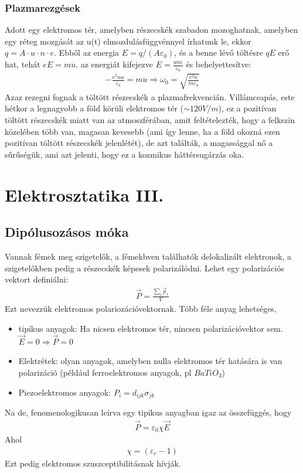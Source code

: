 \documentclass{article}
\begin{document}
\subsubsection{Plazmarezgések}
Adott egy elektromos tér, amelyben részecskék szabadon mozoghatnak, amelyben egy réteg mozgását az u(t) elmozdulásfüggvénnyel írhatunk le, ekkor $q=A\cdot u \cdot n \cdot e$. Ebből az energia $E=q/(A\varepsilon_0)$, és a benne lévő töltésre $qE$ erő hat, tehát $eE=m\ddot{u}$. az energiát kifejezve $E=\frac{une}{\varepsilon_0}$ és behelyettesítve:
\begin{gather*}
-\frac{e^2 n u}{\varepsilon_0} = m\ddot{u} \Rightarrow \omega_0 = \sqrt{\frac{e^2 n}{m\varepsilon_0}}
\end{gather*}
Azaz rezegni fognak a töltött részecskék a plazmafrekvencián.
Villámcsapás, este hétkor a legnagyobb a föld körüli elektromos tér ($\sim 120 V/m$), ez a pozitívan töltött részecskék miatt van az atmoszférában, amit feltételezték, hogy a felkszín közelében több van, magasan kevesebb (ami így lenne, ha a föld okozná ezen pozitívan töltött részecskék jelenlétét), de azt találták, a magassággal nő a sűrűségük, ami azt jelenti, hogy ez a kozmikus háttérsugárzás oka. 

\newpage
\section{Elektrosztatika III.}
\subsection{Dipólusozásos móka}
Vannak fémek meg szigetelők, a fémekbven találhatók delokalizált elektronok, a szigetelőkben pedig a részecskék képesek polarizálódni. Lehet egy polarizációs vektort definiálni:
\begin{gather*}
\vec{P} = \frac{\sum_i \vec{p}_i}{V}
\end{gather*}
Ezt nevezzük elektromos polariozációvektornak. Több féle anyag lehetséges, 
\begin{itemize}
\item tipikus anyagok: Ha nicsen elektromos tér, nincsen polarizációvektor sem. $\vec{E}=0 \Rightarrow \vec{P}=0$ 
\item Elektrétek: olyan anyagok, amelyben nulla elektromos tér hatására is van polarizáció (például ferroelektromos anyagok, pl $BaTiO_3$)
\item Piezoelektromos anyagok: $P_i = d_{ijk} \sigma_{jk}$
\end{itemize}
Na de, fenomenologikusan leírva egy tipikus anyagban igaz az összefüggés, hogy
\begin{gather*}
\vec{P} = \varepsilon_0 \chi \vec{E}
\end{gather*}
Ahol \begin{gather*}
\chi = (\varepsilon_r-1)
\end{gather*}
Ezt pedig elektromos szuszceptibilitásnak hívják.
\end{document}
